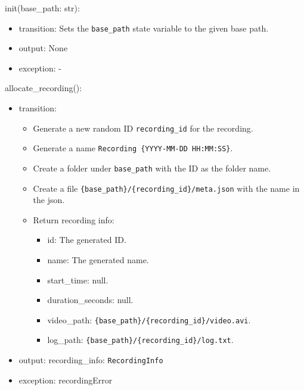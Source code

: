 \documentclass[12pt, titlepage]{article}
\begin{document}
\noindent init(base\_path: str):
\begin{itemize}
  \item transition: Sets the \texttt{base\_path} state variable to the given base path.
  \item output: None
  \item exception: -
\end{itemize}

\noindent allocate\_recording():
\begin{itemize}
  \item transition:
        \begin{itemize}
          \item Generate a new random ID \texttt{recording\_id} for the recording.
          \item Generate a name \texttt{Recording \{YYYY-MM-DD HH:MM:SS\}}.
          \item Create a folder under \texttt{base\_path} with the ID as the folder name.
          \item Create a file \texttt{\{base\_path\}/\{recording\_id\}/meta.json} with the name
                in the json.
          \item Return recording info:
                \begin{itemize}
                  \item id: The generated ID.
                  \item name: The generated name.
                  \item start\_time: null.
                  \item duration\_seconds: null.
                  \item video\_path: \texttt{\{base\_path\}/\{recording\_id\}/video.avi}.
                  \item log\_path: \texttt{\{base\_path\}/\{recording\_id\}/log.txt}.
                \end{itemize}
        \end{itemize}
  \item output: recording\_info: \texttt{RecordingInfo}
  \item exception: recordingError
\end{itemize}
\end{document}
